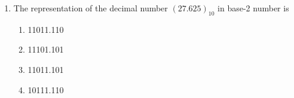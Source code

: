 \documentclass{article}
\begin{document}
\begin{enumerate}     
\item The representation of the decimal number $(27.625)_{10}$ in base-2 number is
\begin{enumerate}[label=(\Alph*)]
    \item 11011.110
    \item 11101.101
    \item 11011.101
    \item 10111.110
\end{enumerate}
\end{enumerate}
\end{document}
